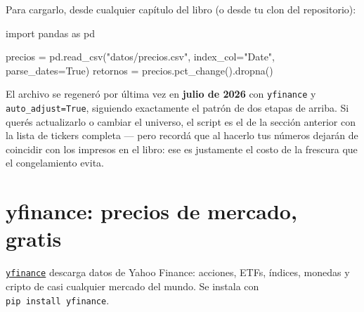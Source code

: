 \documentclass[
  spanish,
  letterpaper,
  DIV=11,
  numbers=noendperiod]{scrreprt}
\newenvironment{Shaded}{\begin{snugshade}}{\end{snugshade}}
\newcommand{\ImportTok}[1]{\textcolor[rgb]{0.00,0.46,0.62}{#1}}
\newcommand{\NormalTok}[1]{\textcolor[rgb]{0.00,0.23,0.31}{#1}}
\newcommand{\OperatorTok}[1]{\textcolor[rgb]{0.37,0.37,0.37}{#1}}
\newcommand{\StringTok}[1]{\textcolor[rgb]{0.13,0.47,0.30}{#1}}
\newcommand{\VariableTok}[1]{\textcolor[rgb]{0.07,0.07,0.07}{#1}}
\begin{document}
Para cargarlo, desde cualquier capítulo del libro (o desde tu clon del
repositorio):

\begin{Shaded}
\begin{Highlighting}[]
\ImportTok{import}\NormalTok{ pandas }\ImportTok{as}\NormalTok{ pd}

\NormalTok{precios }\OperatorTok{=}\NormalTok{ pd.read\_csv(}\StringTok{"datos/precios.csv"}\NormalTok{, index\_col}\OperatorTok{=}\StringTok{"Date"}\NormalTok{, parse\_dates}\OperatorTok{=}\VariableTok{True}\NormalTok{)}
\NormalTok{retornos }\OperatorTok{=}\NormalTok{ precios.pct\_change().dropna()}
\end{Highlighting}
\end{Shaded}

El archivo se regeneró por última vez en \textbf{julio de 2026} con
\texttt{yfinance} y \texttt{auto\_adjust=True}, siguiendo exactamente el
patrón de dos etapas de arriba. Si querés actualizarlo o cambiar el
universo, el script es el de la sección anterior con la lista de tickers
completa --- pero recordá que al hacerlo tus números dejarán de
coincidir con los impresos en el libro: ese es justamente el costo de la
frescura que el congelamiento evita.

\section{yfinance: precios de mercado,
gratis}\label{yfinance-precios-de-mercado-gratis}

\href{https://github.com/ranaroussi/yfinance}{\texttt{yfinance}}
descarga datos de Yahoo Finance: acciones, ETFs, índices, monedas y
cripto de casi cualquier mercado del mundo. Se instala con
\texttt{pip\ install\ yfinance}.
\end{document}
